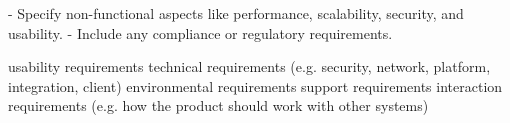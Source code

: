    - Specify non-functional aspects like performance, scalability, security, and usability.
   - Include any compliance or regulatory requirements.

usability requirements
technical requirements (e.g. security, network, platform, integration, client)
environmental requirements
support requirements
interaction requirements (e.g. how the product should work with other systems)